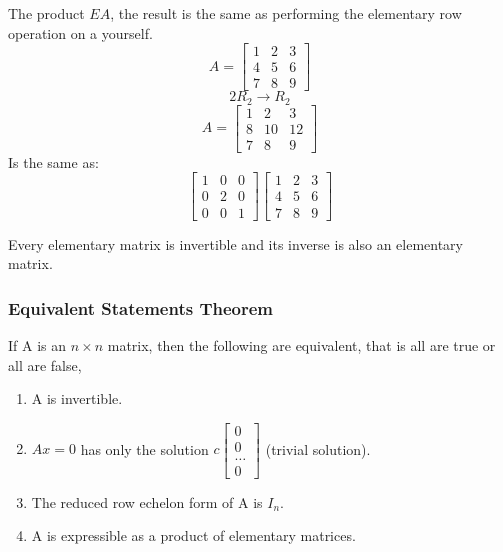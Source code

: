 The product $EA$, the result is the same as performing the elementary
row operation on a yourself.
\[A = \begin{bmatrix}  1 & 2 & 3 \\ 4 & 5 & 6 \\ 7 & 8 &  9 \end{bmatrix} \]
\[2R_2\to R_2\]
\[A = \begin{bmatrix}  1 & 2 & 3 \\ 8 & 10 & 12 \\ 7 & 8 &  9 \end{bmatrix} \]
Is the same as:
\[\begin{bmatrix} 1 & 0 & 0 \\ 0 & 2 & 0 \\ 0 & 0 & 1 \end{bmatrix} \begin{bmatrix}  1 & 2 & 3 \\ 4 & 5 & 6 \\ 7 & 8 &  9 \end{bmatrix} \]

\begin{theorem}[]
	Every elementary matrix is invertible and its inverse is also an
	elementary matrix.
\end{theorem}

\subsubsection{Equivalent Statements Theorem}%
\label{ssub:equivalent_statements}

\begin{theorem}[]
If A is an $n\times n$ matrix, then the following are equivalent, that is all
are true or all are false,
\begin{enumerate}[label=\Alph*]
	\item A is invertible.
	\item $Ax = 0$ has only the solution $c\begin{bmatrix} 0 \\ 0 \\ \ldots \\ 0  \end{bmatrix} $ (trivial solution).
		\item The reduced row echelon form of A is $I_{n}$.
			\item A is expressible as a product of elementary matrices.
\end{enumerate}
\end{theorem}

